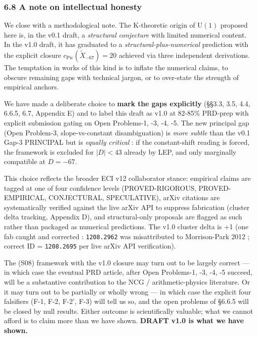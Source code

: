 \documentclass[
  11pt,
  a4paper,
]{article}
\begin{document}
\hypertarget{a-note-on-intellectual-honesty}{%
\subsubsection{6.8 A note on intellectual honesty}\label{a-note-on-intellectual-honesty}}

We close with a methodological note. The K-theoretic origin of \(\mathrm{U}(1)\) proposed here is, in the v0.1 draft, a \emph{structural conjecture} with limited numerical content. In the v1.0 draft, it has graduated to a \emph{structural-plus-numerical} prediction with the explicit closure \(c_{\mathrm{Pic}}(\tilde X_{-67}) = 20\) achieved via three independent derivations. The temptation in works of this kind is to inflate the numerical claims, to obscure remaining gaps with technical jargon, or to over-state the strength of empirical anchors.

We have made a deliberate choice to \textbf{mark the gaps explicitly} (§§3.3, 3.5, 4.4, 6.6.5, 6.7, Appendix E) and to label this draft as v1.0 at 82-85\% PRD-prep with explicit submission gating on Open Problems-1, -3, -4, -5. The new principal gap (Open Problem-3, slope-vs-constant disambiguation) is \emph{more subtle} than the v0.1 Gap-3 PRINCIPAL but is \emph{equally critical} : if the constant-shift reading is forced, the framework is excluded for \(|D| < 43\) already by LEP, and only marginally compatible at \(D = -67\).

This choice reflects the broader ECI v12 collaborator stance: empirical claims are tagged at one of four confidence levels (PROVED-RIGOROUS, PROVED-EMPIRICAL, CONJECTURAL, SPECULATIVE), arXiv citations are systematically verified against the live arXiv API to suppress fabrication (cluster delta tracking, Appendix D), and structural-only proposals are flagged as such rather than packaged as numerical predictions. The v1.0 cluster delta is +1 (one fab caught and corrected : \texttt{1208.2962} was misattributed to Morrison-Park 2012 ; correct ID = \texttt{1208.2695} per live arXiv API verification).

The (S08) framework with the v1.0 closure may turn out to be largely correct --- in which case the eventual PRD article, after Open Problems-1, -3, -4, -5 succeed, will be a substantive contribution to the NCG / arithmetic-physics literature. Or it may turn out to be partially or wholly wrong --- in which case the explicit four falsifiers (F-1, F-2, F-2', F-3) will tell us so, and the open problems of §6.6.5 will be closed by null results. Either outcome is scientifically valuable; what we cannot afford is to claim more than we have shown. \textbf{DRAFT v1.0 is what we have shown.}
\end{document}
